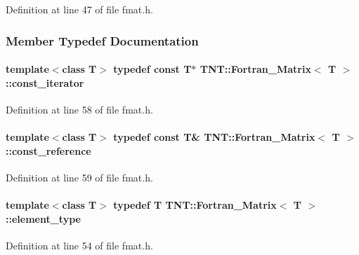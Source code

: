 Definition at line 47 of file fmat.h.



\subsubsection{Member Typedef Documentation}
\paragraph[{const\_\-iterator}]{\setlength{\rightskip}{0pt plus 5cm}template$<$class T$>$ typedef const T$\ast$ {\bf TNT::Fortran\_\-Matrix}$<$ T $>$::{\bf const\_\-iterator}}\hfill\label{class_t_n_t_1_1_fortran___matrix_aa8fa0adc986fcd5bfb1904ad8ca0dabd}


Definition at line 58 of file fmat.h.

\paragraph[{const\_\-reference}]{\setlength{\rightskip}{0pt plus 5cm}template$<$class T$>$ typedef const T\& {\bf TNT::Fortran\_\-Matrix}$<$ T $>$::{\bf const\_\-reference}}\hfill\label{class_t_n_t_1_1_fortran___matrix_a78f281e015ad8409f1e5e70eea2a04a2}


Definition at line 59 of file fmat.h.

\paragraph[{element\_\-type}]{\setlength{\rightskip}{0pt plus 5cm}template$<$class T$>$ typedef T {\bf TNT::Fortran\_\-Matrix}$<$ T $>$::{\bf element\_\-type}}\hfill\label{class_t_n_t_1_1_fortran___matrix_a6b73e97863754a86cad624af6186ef1f}


Definition at line 54 of file fmat.h.

